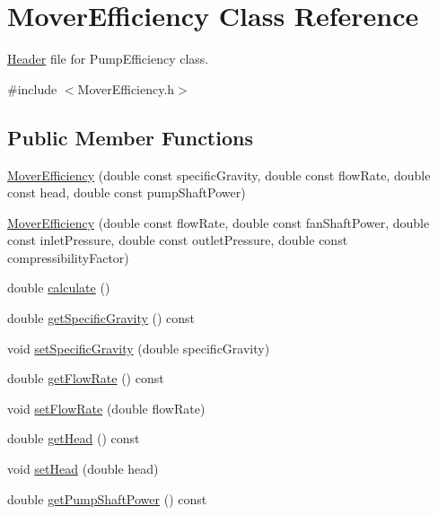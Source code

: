 \hypertarget{class_mover_efficiency}{}\section{Mover\+Efficiency Class Reference}
\label{class_mover_efficiency}


\hyperlink{class_header}{Header} file for Pump\+Efficiency class.  




{\ttfamily \#include $<$Mover\+Efficiency.\+h$>$}

\subsection*{Public Member Functions}
\begin{DoxyCompactItemize}
\item 
\hyperlink{class_mover_efficiency_a582aada664da565f184c319d9304596f}{Mover\+Efficiency} (double const specific\+Gravity, double const flow\+Rate, double const head, double const pump\+Shaft\+Power)
\item 
\hyperlink{class_mover_efficiency_a275951aede53c027e5d25589d401caa5}{Mover\+Efficiency} (double const flow\+Rate, double const fan\+Shaft\+Power, double const inlet\+Pressure, double const outlet\+Pressure, double const compressibility\+Factor)
\item 
double \hyperlink{class_mover_efficiency_ae7b997f1e2fcff1d4263e9921c1a8d9b}{calculate} ()
\item 
double \hyperlink{class_mover_efficiency_a4acdd89fec01daef4902238202e00884}{get\+Specific\+Gravity} () const
\item 
void \hyperlink{class_mover_efficiency_aed095f525636345bdfebe76774afa2d4}{set\+Specific\+Gravity} (double specific\+Gravity)
\item 
double \hyperlink{class_mover_efficiency_a3b0d468a68703127624ab996f03d2368}{get\+Flow\+Rate} () const
\item 
void \hyperlink{class_mover_efficiency_a35bf328fcd7e8334d552bce8b8704379}{set\+Flow\+Rate} (double flow\+Rate)
\item 
double \hyperlink{class_mover_efficiency_a9ce5f2dba38ae4f271bdb2c018667144}{get\+Head} () const
\item 
void \hyperlink{class_mover_efficiency_a1dce269494ecdfc348c8d0a3f9d33df6}{set\+Head} (double head)
\item 
double \hyperlink{class_mover_efficiency_a367c3cb3a070cef9de5e3ca87bbf62fe}{get\+Pump\+Shaft\+Power} () const

\end{DoxyCompactItemize}
